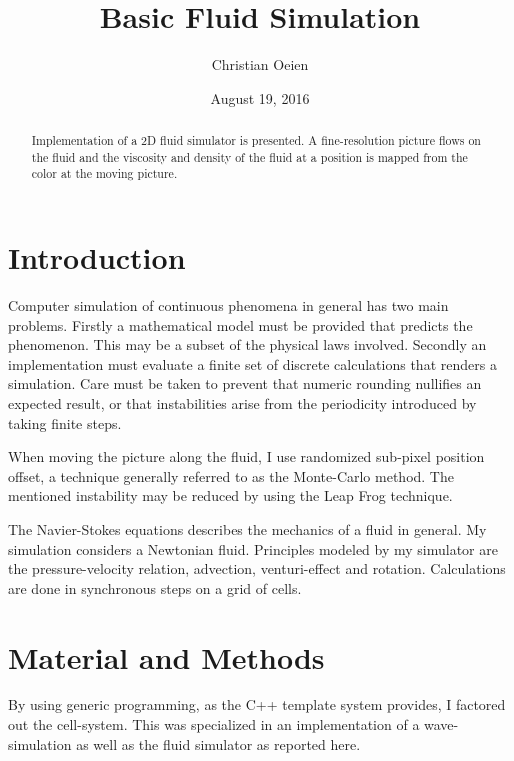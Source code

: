 \documentclass{article}
\begin{document}
\title{Basic Fluid Simulation}
\author{Christian Oeien}
\date{August 19, 2016}
\maketitle

\begin{abstract}

Implementation of a 2D fluid simulator is presented.
A fine-resolution picture flows on the fluid and
the viscosity and density of the fluid at a position
is mapped from the color at the moving picture.
\end{abstract}

\section{Introduction}

Computer simulation of continuous phenomena in general
has two main problems.  Firstly a mathematical model must
be provided that predicts the phenomenon.  This may be
a subset of the physical laws involved.
Secondly an implementation must evaluate a finite set
of discrete calculations that renders a simulation.
Care must be taken to prevent that numeric rounding
nullifies an expected result,
or that instabilities arise from the periodicity
introduced by taking finite steps.

When moving the picture along the fluid, I use randomized
sub-pixel position offset, a technique generally referred to
as the Monte-Carlo method.  The mentioned instability
may be reduced by using the Leap Frog technique.
\begin{comment}
described in \cite{leapfrog}.
\end{comment}

The Navier-Stokes equations describes the mechanics
of a fluid in general.  My simulation considers
a Newtonian fluid.
Principles modeled by my simulator are
the pressure-velocity relation, advection,
venturi-effect and rotation.  Calculations are done
in synchronous steps on a grid of cells.

\section{Material and Methods}

By using generic programming, as the C++ template system
provides, I factored out the cell-system.  This was
specialized in an implementation of a wave-simulation as
well as the fluid simulator as reported here.
\end{document}
